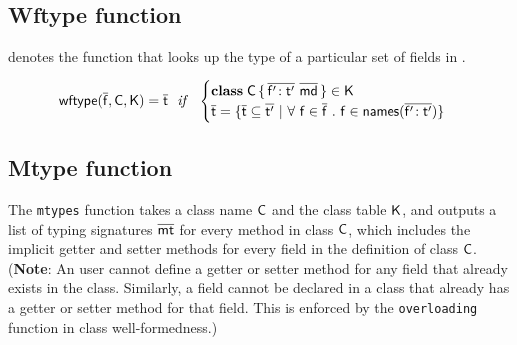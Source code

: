 \documentclass[a4paper,USenglish]{tex/lipics-v2016}
\begin{document}

\begin{mathpar}



\end{mathpar}
\\

\subsection{Wftype function}

\wftype{\b\f}\C\K denotes the function that looks up the type of a particular set of fields in \C.

\begin{equation*}
\wftype{\b\f}\C\K = \b\t ~~\mathit{if}~~ \begin{cases}

 \Class \C {\b{\Ftype\fp\tp}}{\b\md} \in \K\\
 \b\t = \{ \b\t \subseteq \b\tp ~|~ \forall~ \f \in \b\f ~.~ \f \in \names{\b{\Ftype\fp\tp}} \} \\
 
\end{cases}
\end{equation*}

\subsection{Mtype function}

The \texttt{mtypes} function takes a class name $\C$ and the class table
$\K$, and outputs a list of typing signatures $\b\mt$ for every method in
class $\C$, which includes the implicit getter and setter methods for every
field in the definition of class $\C$.  (\textbf{Note}: An user cannot
define a getter or setter method for any field that already exists in the
class. Similarly, a field cannot be declared in a class that already has a
getter or setter method for that field. This is enforced by the
\texttt{overloading} function in class well-formedness.)
\end{document}
